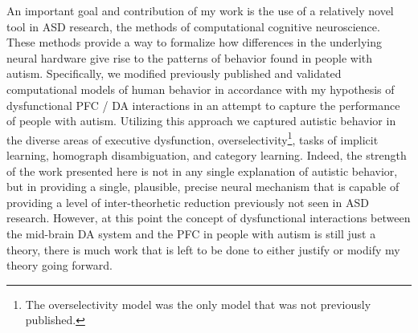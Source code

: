 %
%

An important goal and contribution of my work is the use of a relatively novel tool in ASD research, the methods of computational cognitive neuroscience.  These methods provide a way to formalize how differences in the underlying neural hardware give rise to the patterns of behavior found in people with autism.  Specifically, we modified previously published and validated computational models of human behavior in accordance with my hypothesis of dysfunctional PFC / DA interactions in an attempt to capture the performance of people with autism.  Utilizing this approach we captured autistic behavior in the diverse areas of executive dysfunction, overselectivity\footnote{The overselectivity model was the only model that was not previously published.}, tasks of implicit learning, homograph disambiguation, and category learning.  Indeed, the strength of the work presented here is not in any single explanation of autistic behavior, but in providing a single, plausible, precise neural mechanism that is capable of providing a level of inter-theorhetic reduction previously not seen in ASD research.  However, at this point the concept of dysfunctional interactions between the mid-brain DA system and the PFC in people with autism is still just a theory, there is much work that is left to be done to either justify or modify my theory going forward. 


